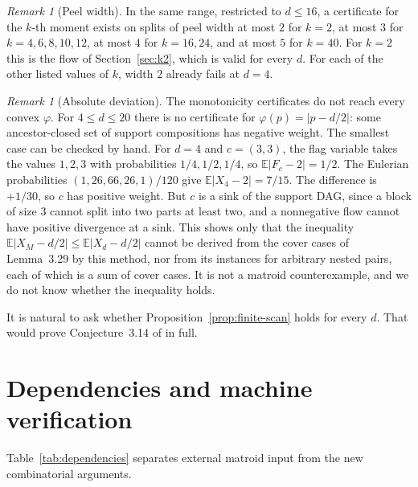 \documentclass[11pt]{amsart}
\theoremstyle{definition}
\theoremstyle{remark}
\newtheorem{remark}[theorem]{Remark}
\newcommand{\E}{\mathbb E}
\begin{document}
\begin{remark}[Peel width]
In the same range, restricted to $d\le16$, a certificate for the $k$-th
moment exists on splits of peel width at most $2$ for $k=2$, at most $3$ for
$k=4,6,8,10,12$, at most $4$ for $k=16,24$, and at most $5$ for $k=40$.  For
$k=2$ this is the flow of Section~\ref{sec:k2}, which is valid for every
$d$.  For each of the other listed values of $k$, width $2$ already fails at
$d=4$.
\end{remark}

\begin{remark}[Absolute deviation]
\label{rem:absolute-deviation}
The monotonicity certificates do not reach every convex $\varphi$.  For
$4\le d\le20$ there is no certificate for $\varphi(p)=|p-d/2|$: some
ancestor-closed set of support compositions has negative weight.  The
smallest case can be checked by hand.  For $d=4$ and $c=(3,3)$, the flag
variable takes the values $1,2,3$ with probabilities $1/4,1/2,1/4$, so
$\E|F_c-2|=1/2$.  The Eulerian probabilities $(1,26,66,26,1)/120$ give
$\E|X_4-2|=7/15$.  The difference is $+1/30$, so $c$ has positive weight.
But $c$ is a sink of the support DAG, since a block of size $3$ cannot split
into two parts at least two, and a nonnegative flow cannot have positive
divergence at a sink.
This shows only that the inequality $\E|X_M-d/2|\le\E|X_d-d/2|$ cannot be
derived from the cover cases of Lemma~3.29 by this method, nor from its
instances for arbitrary nested pairs, each of which is a sum of cover cases.
It is not a matroid counterexample, and we do not know whether the
inequality holds.
\end{remark}

It is natural to ask whether Proposition~\ref{prop:finite-scan} holds for
every $d$.  That would prove Conjecture~3.14 of \cite{ChengLin} in full.

\section{Dependencies and machine verification}
\label{sec:dependencies}

Table~\ref{tab:dependencies} separates external matroid input from the new
combinatorial arguments.
\end{document}
